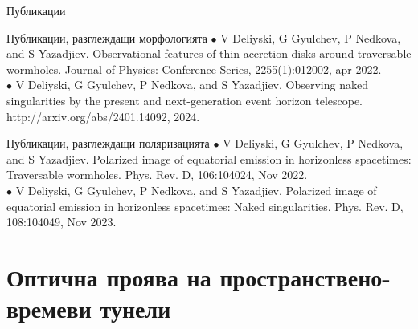 \documentclass[hyperref={colorlinks,citecolor=blue,linkcolor=blue,urlcolor=blue}]{beamer}
\begin{document}
	\begin{frame}{Публикации}
		
		\begin{block}{Публикации, разглеждащи морфологията}
			\small
			$\bullet$ V Deliyski, G Gyulchev, P Nedkova, and S Yazadjiev. Observational features
			of thin accretion disks around traversable wormholes. Journal of Physics:
			Conference Series, 2255(1):012002, apr 2022.\\
			$\bullet$ V Deliyski, G Gyulchev, P Nedkova, and S Yazadjiev.
			Observing naked singularities by the present and next-generation event horizon
			telescope. http://arxiv.org/abs/2401.14092, 2024.
		\end{block}
		
		\begin{block}{Публикации, разглеждащи поляризацията}
			\small
			$\bullet$ V Deliyski, G Gyulchev, P Nedkova, and S Yazadjiev.
			Polarized image of equatorial emission in horizonless spacetimes: Traversable
			wormholes. Phys. Rev. D, 106:104024, Nov 2022.\\
			$\bullet$ V Deliyski, G Gyulchev, P Nedkova, and S Yazadjiev.
			Polarized image of equatorial emission in horizonless spacetimes: Naked
			singularities. Phys. Rev. D, 108:104049, Nov 2023.
		\end{block}
		
	\end{frame}
	
	\section{Оптична проява на пространствено-времеви тунели}
	
\end{document}
